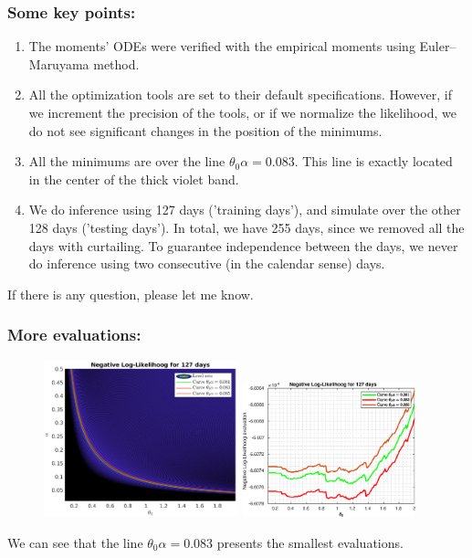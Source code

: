 \documentclass[aspectratio=169]{beamer}\usepackage[utf8]{inputenc}
\begin{document}
\begin{frame}\frametitle{Some key points:}

\begin{enumerate}

\item The moments' ODEs were verified with the empirical moments using Euler–Maruyama method.
\item All the optimization tools are set to their default specifications. However, if we increment the precision of the tools, or if we normalize the likelihood, we do not see significant changes in the position of the minimums.
\item All the minimums are over the line $\theta_0\alpha=0.083$. This line is exactly located in the center of the thick violet band.
\item We do inference using 127 days ('training days'), and simulate over the other 128 days ('testing days'). In total, we have  255 days, since we removed all the days with curtailing. To guarantee independence between the days, we never do inference using two consecutive (in the calendar sense) days.

\end{enumerate}
\alert{If there is any question, please let me know.}
\end{frame}


\begin{frame}\frametitle{More evaluations:}

\begin{figure}[ht!]
\centering
\includegraphics[width=0.5\textwidth]{../../MATLAB_Files/Results/likelihood/normal/Log-Likelihood_Line.eps}
\includegraphics[width=0.45\textwidth]{../../MATLAB_Files/Results/likelihood/normal/Log-Likelihood_Evaluations.eps}
\end{figure}

We can see that the line $\theta_0\alpha=0.083$ presents the smallest evaluations.

\end{frame}
\end{document}
